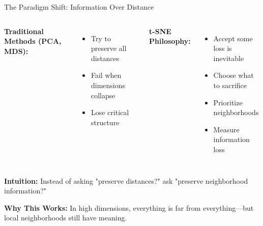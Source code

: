 \documentclass[aspectratio=169]{beamer}
\newcommand{\intuition}[1]{\colorbox{green!10}{\textcolor{intuitioncolor}{\textbf{Intuition:} #1}}}
\begin{document}
\begin{frame}{The Paradigm Shift: Information Over Distance}
\begin{columns}
\textbf{Traditional Methods (PCA, MDS):}
\begin{itemize}
\item Try to preserve all distances
\item Fail when dimensions collapse
\item Lose critical structure
\end{itemize}

\vspace{0.3cm}
\textbf{t-SNE Philosophy:}
\begin{itemize}
\item Accept some loss is inevitable
\item Choose what to sacrifice
\item Prioritize neighborhoods
\item Measure information loss
\end{itemize}

\end{columns}

\vspace{0.3cm}
\intuition{Instead of asking "preserve distances?" ask "preserve neighborhood information?"}

\vspace{0.2cm}
\textbf{Why This Works:} In high dimensions, everything is far from everything—but local neighborhoods still have meaning.
\end{frame}
\end{document}
